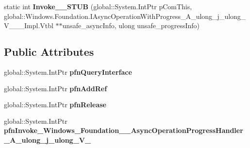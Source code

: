 \begin{DoxyCompactItemize}
\item 
\mbox{\label{struct_windows_1_1_foundation_1_1_async_operation_progress_handler___a__ulong__j__ulong___v_______impl_1_1_vtbl_a7b029958fa48e989f523d85c1627a34e}} 
static int {\bfseries Invoke\+\_\+\+\_\+\+S\+T\+UB} (global\+::\+System.\+Int\+Ptr p\+Com\+This, global\+::\+Windows.\+Foundation.\+I\+Async\+Operation\+With\+Progress\+\_\+\+A\+\_\+ulong\+\_\+j\+\_\+ulong\+\_\+\+V\+\_\+\+\_\+\+\_\+\+Impl.\+Vtbl $\ast$$\ast$unsafe\+\_\+async\+Info, ulong unsafe\+\_\+progress\+Info)
\end{DoxyCompactItemize}
\subsection*{Public Attributes}
\begin{DoxyCompactItemize}
\item 
\mbox{\label{struct_windows_1_1_foundation_1_1_async_operation_progress_handler___a__ulong__j__ulong___v_______impl_1_1_vtbl_a0fe1ce239445fd1688499962788a4e9c}} 
global\+::\+System.\+Int\+Ptr {\bfseries pfn\+Query\+Interface}
\item 
\mbox{\label{struct_windows_1_1_foundation_1_1_async_operation_progress_handler___a__ulong__j__ulong___v_______impl_1_1_vtbl_a69a5c4560f844410a69fbcb891345a92}} 
global\+::\+System.\+Int\+Ptr {\bfseries pfn\+Add\+Ref}
\item 
\mbox{\label{struct_windows_1_1_foundation_1_1_async_operation_progress_handler___a__ulong__j__ulong___v_______impl_1_1_vtbl_a3ce803312a244507a380c5f16489b712}} 
global\+::\+System.\+Int\+Ptr {\bfseries pfn\+Release}
\item 
\mbox{\label{struct_windows_1_1_foundation_1_1_async_operation_progress_handler___a__ulong__j__ulong___v_______impl_1_1_vtbl_a66f4db61e2f5b57035ae486f82073cd8}} 
global\+::\+System.\+Int\+Ptr {\bfseries pfn\+Invoke\+\_\+\+Windows\+\_\+\+Foundation\+\_\+\+\_\+\+Async\+Operation\+Progress\+Handler\+\_\+\+A\+\_\+ulong\+\_\+j\+\_\+ulong\+\_\+\+V\+\_\+}
\end{DoxyCompactItemize}
